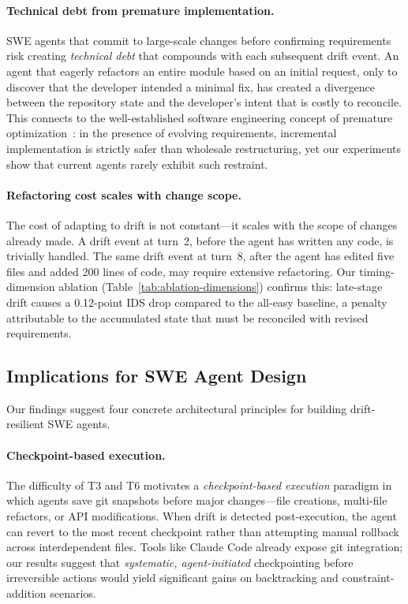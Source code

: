 \paragraph{Technical debt from premature implementation.}
SWE agents that commit to large-scale changes before confirming requirements risk creating \emph{technical debt} that compounds with each subsequent drift event. An agent that eagerly refactors an entire module based on an initial request, only to discover that the developer intended a minimal fix, has created a divergence between the repository state and the developer's intent that is costly to reconcile. This connects to the well-established software engineering concept of premature optimization~\citep{replanningsurvey}: in the presence of evolving requirements, incremental implementation is strictly safer than wholesale restructuring, yet our experiments show that current agents rarely exhibit such restraint.

\paragraph{Refactoring cost scales with change scope.}
The cost of adapting to drift is not constant---it scales with the scope of changes already made. A drift event at turn~2, before the agent has written any code, is trivially handled. The same drift event at turn~8, after the agent has edited five files and added 200 lines of code, may require extensive refactoring. Our timing-dimension ablation (Table~\ref{tab:ablation-dimensions}) confirms this: late-stage drift causes a 0.12-point IDS drop compared to the all-easy baseline, a penalty attributable to the accumulated state that must be reconciled with revised requirements.

\subsection{Implications for SWE Agent Design}
\label{sec:disc-design-swe}

Our findings suggest four concrete architectural principles for building drift-resilient SWE agents.

\paragraph{Checkpoint-based execution.}
The difficulty of T3 and T6 motivates a \emph{checkpoint-based execution} paradigm in which agents save git snapshots before major changes---file creations, multi-file refactors, or API modifications. When drift is detected post-execution, the agent can revert to the most recent checkpoint rather than attempting manual rollback across interdependent files. Tools like Claude Code already expose git integration; our results suggest that \emph{systematic, agent-initiated} checkpointing before irreversible actions would yield significant gains on backtracking and constraint-addition scenarios.

